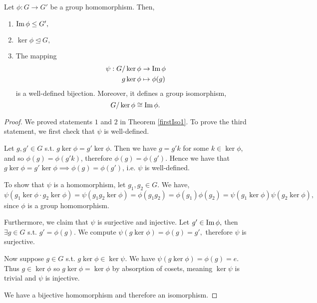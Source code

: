 \begin{theorem} 
  Let $\phi:G\to G'$ be a group homomorphism. Then,
  \begin{enumerate}
    \item $\operatorname{Im}\phi \leq G',$
    \item $\ker\phi \trianglelefteq G,$ 
    
    \item The mapping
      \begin{align*}
          \psi: G/\ker\phi&\to\operatorname{Im}\phi 
          \\ g \ker\phi&\mapsto \phi(g)
      \end{align*}
      is a well-defined bijection. Moreover, it defines a group isomorphism,
      \[G/\ker\phi \cong \operatorname{Im}\phi.\]
  \end{enumerate}
  \label{firstIso}
\end{theorem}
\begin{proof}
   We proved statements $1$ and $2$ in Theorem \ref{firstIso1}. To prove the third statement, we first check that $\psi$ is well-defined. 
   
   Let $g,g'\in G$ s.t. $g\ker\phi=g'\ker\phi$. Then we have $g=g'k$ for some $k\in\ker\phi$, and so $\phi(g)=\phi(g'k)$, therefore $\phi(g)=\phi(g')$.
  Hence we have that
  $g\ker\phi=g'\ker\phi \implies \phi(g)=\phi(g')$, i.e. $\psi$ is well-defined.

    To show that $\psi$ is a homomorphism, let $g_1,g_2 \in G.$ We have,
    $$\psi(g_1\ker \phi \cdot g_2\ker \phi)=\psi(g_1g_2\ker\phi)=\phi(g_1g_2)=\phi(g_1)\phi(g_2)=\psi(g_1\ker\phi)\psi(g_2\ker\phi),$$
    since $\phi$ is a group homomorphism.
   
   Furthermore, we claim that $\psi$ is surjective and injective. Let $g'\in \operatorname{Im} \phi,$ then $\exists g\in G$ s.t. $g'=\phi(g).$ We compute $\psi(g\ker \phi)=\phi(g)=g',$ therefore $\psi$ is surjective.

   Now suppose $g\in G$ s.t. $g\ker\phi\in \ker \psi.$ We have $\psi(g\ker\phi)=\phi(g)=e$. Thus $g \in \ker\phi$ so $g\ker\phi=\ker\phi$ by absorption of cosets, meaning $\ker\psi$ is trivial and $\psi$ is injective. 
   
    We have a bijective homomorphism and therefore an isomorphism.
\end{proof}

